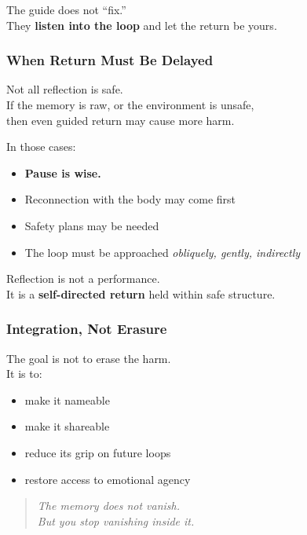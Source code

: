 The guide does not ``fix.''\\
They \textbf{listen into the loop} and let the return be yours.

\subsubsection{\texorpdfstring{\textbf{When Return Must Be
Delayed}}{When Return Must Be Delayed}}\label{when-return-must-be-delayed}

Not all reflection is safe.\\
If the memory is raw, or the environment is unsafe,\\
then even guided return may cause more harm.

In those cases:

\begin{itemize}
\item
  \textbf{Pause is wise.\\
  }
\item
  Reconnection with the body may come first
\item
  Safety plans may be needed
\item
  The loop must be approached \emph{obliquely, gently, indirectly\\
  }
\end{itemize}

Reflection is not a performance.\\
It is a \textbf{self-directed return} held within safe structure.

\subsubsection{\texorpdfstring{\textbf{Integration, Not
Erasure}}{Integration, Not Erasure}}\label{integration-not-erasure}

The goal is not to erase the harm.\\
It is to:

\begin{itemize}
\item
  make it nameable
\item
  make it shareable
\item
  reduce its grip on future loops
\item
  restore access to emotional agency
\end{itemize}

\begin{quote}
\emph{The memory does not vanish.\\
But you stop vanishing inside it.}
\end{quote}

